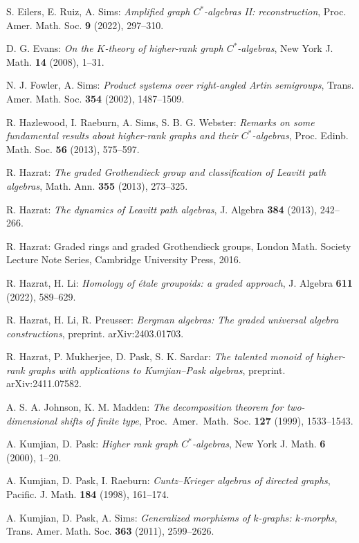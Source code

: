 \documentclass[12pt]{amsart}
\theoremstyle{definition}
\theoremstyle{remark}
\begin{document}
\begin{thebibliography}{}
S. Eilers, E. Ruiz, A. Sims: \emph{Amplified graph $C^*$-algebras II: reconstruction}, Proc. Amer. Math. Soc. \textbf{9} (2022), 297--310.

D. G. Evans: \emph{On the $K$-theory of higher-rank graph $C^*$-algebras}, New York J. Math. \textbf{14} (2008), 1--31.

N. J. Fowler, A. Sims: \emph{Product systems over right-angled Artin semigroups}, Trans. Amer. Math. Soc. \textbf{354} (2002), 1487--1509.

R. Hazlewood, I. Raeburn, A. Sims, S. B. G. Webster: \emph{Remarks on some fundamental results about higher-rank graphs and their $C^*$-algebras}, Proc. Edinb. Math. Soc. \textbf{56} (2013), 575--597.

R. Hazrat: \emph{The graded Grothendieck group and classification of Leavitt path algebras},  Math. Ann. {\bf 355} (2013), 273--325. 

R. Hazrat: \emph{The dynamics of Leavitt path algebras}, J. Algebra \textbf{384} (2013), 242--266.

R. Hazrat: Graded rings and graded Grothendieck groups, London Math. Society Lecture Note Series, Cambridge University Press, 2016.

R. Hazrat, H. Li: \emph{Homology of \'{e}tale groupoids: a graded approach}, J. Algebra \textbf{611} (2022), 589--629.

R. Hazrat, H. Li, R. Preusser: \emph{Bergman algebras: The graded universal algebra constructions}, preprint. arXiv:2403.01703.

R. Hazrat, P. Mukherjee, D. Pask, S. K. Sardar: \emph{The talented monoid of higher-rank graphs with applications to Kumjian--Pask algebras}, preprint. arXiv:2411.07582.

A. S. A. Johnson, K. M. Madden: \emph{The decomposition theorem for two-dimensional shifts of finite type}, Proc.\ Amer.\ Math.\ Soc. \textbf{127} (1999), 1533--1543.

A. Kumjian, D. Pask: \emph{Higher rank graph $C^*$-algebras}, New York J. Math. \textbf{6} (2000), 1--20.

A. Kumjian, D. Pask, I. Raeburn: \emph{Cuntz--Krieger algebras of directed graphs}, Pacific. J. Math. \textbf{184} (1998), 161--174.

A. Kumjian, D. Pask, A. Sims: \emph{Generalized morphisms of $k$-graphs: $k$-morphs}, Trans. Amer. Math. Soc. \textbf{363} (2011), 2599--2626.


\end{thebibliography}
\end{document}
